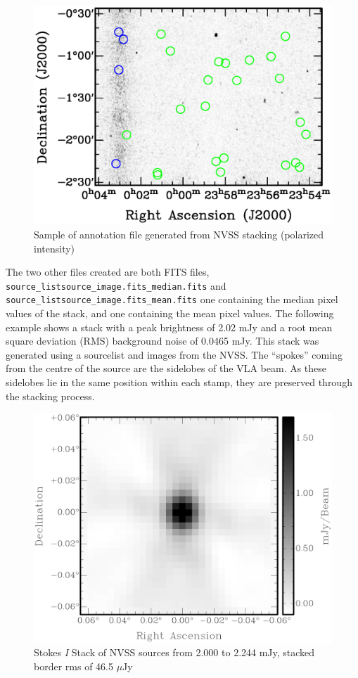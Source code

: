 \documentclass{article}
\begin{document}
\begin{figure}[H]
\centering
\includegraphics{annotation.eps}
\caption[Annotation Sample]{Sample of annotation file generated from NVSS stacking (polarized intensity)}
\end{figure}

\pagebreak
The two other files created are both FITS files, 
\verb!source_listsource_image.fits_median.fits! and 
\verb!source_listsource_image.fits_mean.fits! one containing the median pixel 
values of the stack, and one containing the mean pixel values. The following 
example shows a stack with a peak brightness of 2.02 mJy and a root mean square
deviation (RMS) background noise of 0.0465 mJy.  This stack was generated using
a sourcelist and images from the NVSS.\cite[Condon et al. 1998] {NVSS1998} The 
``spokes'' coming from the centre of the source are the sidelobes of the VLA beam.
As these sidelobes lie in the same position within each stamp, they are 
preserved through the stacking process.
\begin{figure}[H]
\centering
\includegraphics[scale=0.75]{stack.eps}
\caption[Stack Sample]{Stokes \emph{I} Stack of NVSS sources from 2.000 to 2.244 mJy, stacked border rms of 46.5 $\mu$Jy}
\end{figure}
\end{document}
